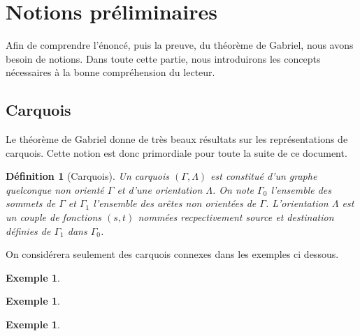 \documentclass[a4paper,10pt]{article}
\newtheorem{defi}[thm]{Définition}%
\newtheorem{ex}[thm]{Exemple}%
\begin{document}
\section{Notions préliminaires}
Afin de comprendre l'énoncé, puis la preuve, du théorème de Gabriel, nous avons besoin de notions. Dans toute cette partie, nous introduirons les concepts nécessaires à la bonne compréhension du lecteur.

\subsection{Carquois}
Le théorème de Gabriel donne de très beaux résultats sur les représentations de carquois. Cette notion est donc primordiale pour toute la suite de ce document.
\begin{defi}[Carquois]
	\label{carquois}
	Un \emph{carquois} $(\Gamma,\Lambda)$ est constitué d'un graphe quelconque non orienté $\Gamma$ et d'une orientation $\Lambda$. On note  $\Gamma_0$ l'ensemble des sommets de $\Gamma$ et $\Gamma_1$ l'ensemble des arêtes non orientées de $\Gamma$. L'orientation $\Lambda$ est un couple de fonctions $(s,t)$ nommées recpectivement source et destination définies de $\Gamma_1$ dans $\Gamma_0$. 
\end{defi}
On considérera seulement des carquois connexes dans les exemples ci dessous.
	\begin{ex}
	\end{ex}
	\begin{ex}
	\end{ex}
	\begin{ex}
	\end{ex}
\end{document}
